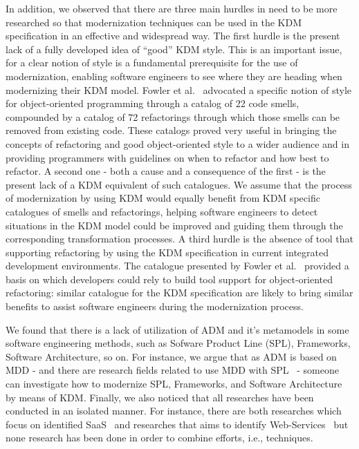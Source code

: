 In addition, we observed that there are three main hurdles in need to be more researched so that modernization techniques can be used in the KDM specification in an effective and widespread way. The first hurdle is the present lack of a fully developed idea of ``good'' KDM style. This is an important issue, for a clear notion of style is a fundamental prerequisite for the use of modernization, enabling software engineers to see where they are heading when modernizing their KDM model. Fowler et al.~\cite{refactImpro} advocated a specific notion of style for object-oriented programming through a catalog of 22 code smells, compounded by a catalog of 72 refactorings through which those smells can be removed from existing code. These catalogs proved very useful in bringing the concepts of refactoring and good object-oriented style to a wider audience and in providing programmers with guidelines on when to refactor and how best to refactor. A second one - both a cause and a consequence of the first - is the present lack of a KDM equivalent of such catalogues. We assume that the process of modernization by using KDM would equally benefit from KDM specific catalogues of smells and refactorings, helping software engineers to detect situations in the KDM model could be improved and guiding them through the corresponding transformation processes. A third hurdle is the absence of tool that supporting refactoring by using the KDM specification in current integrated development environments. The catalogue presented by Fowler et al.~\cite{refactImpro} provided a basis on which developers could rely to build tool support for object-oriented refactoring: similar catalogue for the KDM specification are likely to bring similar benefits to assist software engineers during the modernization process.

We found that there is a lack of utilization of ADM and it's metamodels in some software engineering methods, such as Sofware Product Line (SPL), Frameworks, Software Architecture, so on. For instance, we argue that as ADM is based on MDD - and there are research fields related to use MDD with SPL~\cite{4335247} - someone can investigate how to modernize SPL, Frameworks, and Software Architecture by means of KDM. Finally, we also noticed that all researches have been conducted in an isolated manner. For instance, there are both researches which focus on identified SaaS~\cite{5741334, SMR:SMR582} and researches that aims to identify Web-Services~\cite{delCastillo:2009:PRP:1529282.1529753, ICEISPerez:CastilloGCP12} but none research has been done in order to combine efforts, i.e., techniques. 